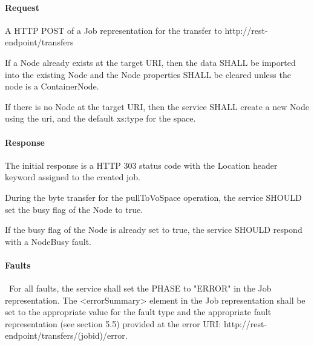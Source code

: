 \documentclass[11pt,a4paper]{ivoa}
\begin{document}
\paragraph{Request}
A HTTP POST of a Job representation for the transfer to http://rest-endpoint/transfers

If a Node already exists at the target URI, then the data SHALL be imported into the existing Node and the Node properties SHALL be cleared unless the node is a ContainerNode.

If there is no Node at the target URI, then the service SHALL create a new Node using the uri, and the default xs:type for the space.

\paragraph{Response}
The initial response is a HTTP 303 status code with the Location header keyword assigned to the created job.

During the byte transfer for the pullToVoSpace operation, the service SHOULD set the busy flag of the Node to true.

If the busy flag of the Node is already set to true, the service SHOULD respond with a NodeBusy fault.

\paragraph{Faults}\
For all faults, the service shall set the PHASE to "ERROR" in the Job representation. The <errorSummary> element in the Job representation shall be set to the appropriate value for the fault type and the appropriate fault representation (see section 5.5) provided at the error URI: http://rest-endpoint/transfers/(jobid)/error.
\end{document}
